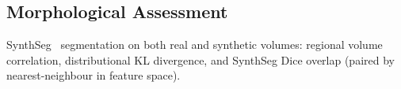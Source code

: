 \subsection{Morphological Assessment}

SynthSeg~\cite{synthseg} segmentation on both real and synthetic volumes:
regional volume correlation, distributional KL divergence, and SynthSeg Dice
overlap (paired by nearest-neighbour in feature space).
